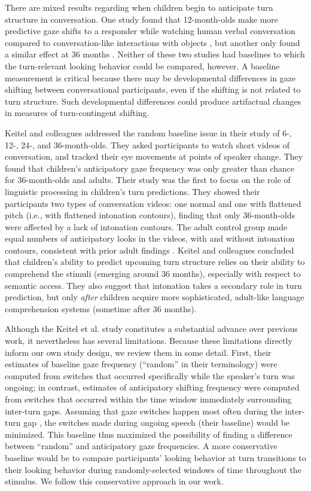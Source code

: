 \documentclass[authoryear, 12pt]{elsarticle}
\begin{document}
There are mixed results regarding when children begin to anticipate turn structure in conversation. One study found that 12-month-olds make more predictive gaze shifts to a responder while watching human verbal conversation compared to conversation-like interactions with objects \citep{bakker2011}, but another only found a similar effect at 36 months \citep{hofsten2009}. Neither of these two studies had baselines to which the turn-relevant looking behavior could be compared, however. A baseline measurement is critical because there may be developmental differences in gaze shifting between conversational participants, even if the shifting is not related to turn structure. Such developmental differences could produce artifactual changes in measures of turn-contingent shifting. 

Keitel and colleagues \citeyearpar{keitel2013} addressed the random baseline issue in their study of 6-, 12-, 24-, and 36-month-olds. They asked participants to watch short videos of conversation, and tracked their eye movements at points of speaker change. They found that children's anticipatory gaze frequency was only greater than chance for 36-month-olds and adults. Their study was the first to focus on the role of linguistic processing in children's turn predictions. They showed their participants two types of conversation videos: one normal and one with flattened pitch (i.e., with flattened intonation contours), finding that only 36-month-olds were affected by a lack of intonation contours. The adult control group made equal numbers of anticipatory looks in the videos, with and without intonation contours, consistent with prior adult findings \citep{de-ruiter2006}. Keitel and colleagues concluded that children's ability to predict upcoming turn structure relies on their ability to comprehend the stimuli (emerging around 36 months), especially with respect to semantic access. They also suggest that intonation takes a secondary role in turn prediction, but only \textit{after} children acquire more sophisticated, adult-like language comprehension systems (sometime after 36 months).

Although the Keitel et al. \citeyearpar{keitel2013} study constitutes a substantial advance over previous work, it nevertheless has several limitations. Because these limitations directly inform our own study design, we review them in some detail. First, their estimates of baseline gaze frequency (``random'' in their terminology) were computed from switches that occurred specifically while the speaker's turn was ongoing; in contrast, estimates of anticipatory shifting frequency were computed from switches that occurred within the time window immediately surrounding inter-turn gaps. Assuming that gaze switches happen most often during the inter-turn gap \citep{hirvenkari2013}, the switches made during ongoing speech (their baseline) would be minimized. This baseline thus maximized the possibility of finding a difference between ``random'' and anticipatory gaze frequencies. A more conservative baseline would be to compare participants' looking behavior at turn transitions to their looking behavior during randomly-selected windows of time throughout the stimulus. We follow this conservative approach in our work. 
\end{document}
